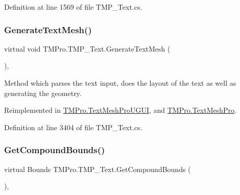 Definition at line 1569 of file T\+M\+P\+\_\+\+Text.\+cs.

\mbox{\label{class_t_m_pro_1_1_t_m_p___text_a537ab0215d185079796cc94a455d2cdc}} 
\subsubsection{\texorpdfstring{GenerateTextMesh()}{GenerateTextMesh()}}
{\footnotesize\ttfamily virtual void T\+M\+Pro.\+T\+M\+P\+\_\+\+Text.\+Generate\+Text\+Mesh (\begin{DoxyParamCaption}{ }\end{DoxyParamCaption})\hspace{0.3cm}{\ttfamily [protected]}, {\ttfamily [virtual]}}



Method which parses the text input, does the layout of the text as well as generating the geometry. 



Reimplemented in \mbox{\hyperlink{class_t_m_pro_1_1_text_mesh_pro_u_g_u_i_ae43d87969cffe98fbaea5edabc0d55dd}{T\+M\+Pro.\+Text\+Mesh\+Pro\+U\+G\+UI}}, and \mbox{\hyperlink{class_t_m_pro_1_1_text_mesh_pro_aa98e9ced224ca5ce5e71cbf213645128}{T\+M\+Pro.\+Text\+Mesh\+Pro}}.



Definition at line 3404 of file T\+M\+P\+\_\+\+Text.\+cs.

\mbox{\label{class_t_m_pro_1_1_t_m_p___text_a0628c368c630a855a7001344fca270ba}} 
\subsubsection{\texorpdfstring{GetCompoundBounds()}{GetCompoundBounds()}}
{\footnotesize\ttfamily virtual Bounds T\+M\+Pro.\+T\+M\+P\+\_\+\+Text.\+Get\+Compound\+Bounds (\begin{DoxyParamCaption}{ }\end{DoxyParamCaption})\hspace{0.3cm}{\ttfamily [protected]}, {\ttfamily [virtual]}}



